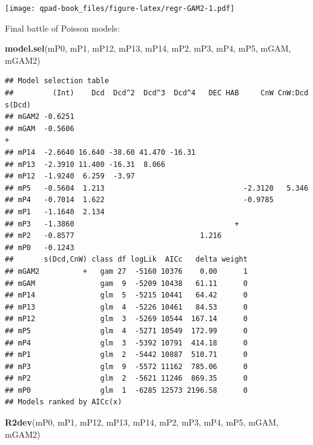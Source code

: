 \documentclass[12pt,]{book}
\newenvironment{Shaded}{\begin{snugshade}}{\end{snugshade}}
\newcommand{\KeywordTok}[1]{\textcolor[rgb]{0.13,0.29,0.53}{\textbf{#1}}}
\newcommand{\NormalTok}[1]{#1}
\begin{document}
\texttt{[image: qpad-book\_files/figure-latex/regr-GAM2-1.pdf]}

Final battle of Poisson models:

\begin{Shaded}
\begin{Highlighting}[]
\KeywordTok{model.sel}\NormalTok{(mP0, mP1, mP12, mP13, mP14, mP2, mP3, mP4, mP5, mGAM, mGAM2)}
\end{Highlighting}
\end{Shaded}

\begin{verbatim}
## Model selection table 
##         (Int)    Dcd  Dcd^2  Dcd^3  Dcd^4   DEC HAB     CnW CnW:Dcd s(Dcd)
## mGAM2 -0.6251                                                             
## mGAM  -0.5606                                                            +
## mP14  -2.6640 16.640 -38.60 41.470 -16.31                                 
## mP13  -2.3910 11.400 -16.31  8.066                                        
## mP12  -1.9240  6.259  -3.97                                               
## mP5   -0.5604  1.213                                -2.3120   5.346       
## mP4   -0.7014  1.622                                -0.9785               
## mP1   -1.1640  2.134                                                      
## mP3   -1.3860                                     +                       
## mP2   -0.8577                             1.216                           
## mP0   -0.1243                                                             
##       s(Dcd,CnW) class df logLik  AICc   delta weight
## mGAM2          +   gam 27  -5160 10376    0.00      1
## mGAM               gam  9  -5209 10438   61.11      0
## mP14               glm  5  -5215 10441   64.42      0
## mP13               glm  4  -5226 10461   84.53      0
## mP12               glm  3  -5269 10544  167.14      0
## mP5                glm  4  -5271 10549  172.99      0
## mP4                glm  3  -5392 10791  414.18      0
## mP1                glm  2  -5442 10887  510.71      0
## mP3                glm  9  -5572 11162  785.06      0
## mP2                glm  2  -5621 11246  869.35      0
## mP0                glm  1  -6285 12573 2196.58      0
## Models ranked by AICc(x)
\end{verbatim}

\begin{Shaded}
\begin{Highlighting}[]
\KeywordTok{R2dev}\NormalTok{(mP0, mP1, mP12, mP13, mP14, mP2, mP3, mP4, mP5, mGAM, mGAM2)}
\end{Highlighting}
\end{Shaded}
\end{document}
